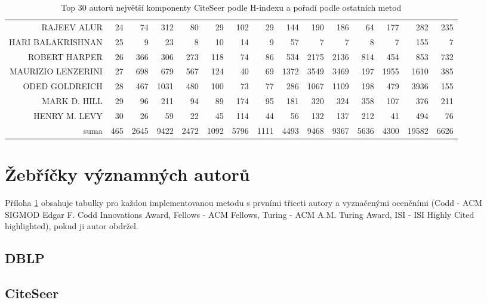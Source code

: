\documentclass{bakalarka}
\begin{document}
\begin{table}[!ht]
\begin{sideways}
\begin{scriptsize}
\begin{tabular}{r|r|rrrrrrrrrrrrr}
RAJEEV ALUR&24&74&312&80&29&102&29&144&190&186&64&177&282&235\\
HARI BALAKRISHNAN&25&9&23&8&10&14&9&57&7&7&8&7&155&7\\
ROBERT HARPER&26&366&306&273&118&74&86&534&2175&2136&814&454&853&732\\
MAURIZIO LENZERINI&27&698&679&567&124&40&69&1372&3549&3469&197&1955&1610&385\\
ODED GOLDREICH&28&467&1031&480&100&73&77&286&1067&1109&198&479&3936&155\\
MARK D. HILL&29&96&211&94&89&174&95&181&320&324&358&107&376&211\\
HENRY M. LEVY&30&26&59&22&45&114&44&56&132&137&212&41&494&76\\
\midrule
suma&465&2645&9422&2472&1092&5796&1111&4493&9468&9367&5636&4300&19582&6626\\
\bottomrule
\end{tabular}
\end{scriptsize}
\end{sideways}
\caption{Top 30 autorů největší komponenty CiteSeer podle H-indexu a pořadí podle ostatních metod}
\label{tab:ranks4}
\end{table}

\newpage
\chapter{Žebříčky významných autorů}
\label{chapter:zebricky}

Příloha \ref{chapter:zebricky} obsahuje tabulky pro každou implementovanou
metodu s prvními třiceti autory a vyznačenými oceněními (Codd - ACM SIGMOD
Edgar F. Codd Innovations Award, Fellows - ACM Fellows, Turing - ACM A.M.
Turing Award, ISI - ISI Highly Cited highlighted), pokud ji autor obdržel.

\newpage
\section{DBLP}
\label{section:zebrickydblp}
















\section{CiteSeer}
\label{section:zebrickyciteseer}















\end{document}

